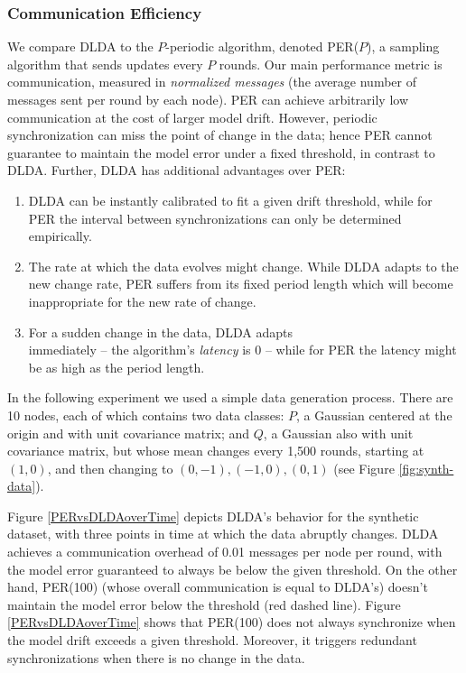 \subsubsection{Communication Efficiency}\label{sec:com_eff}
We compare DLDA to the $P$-periodic algorithm, denoted
PER($P$), a sampling algorithm that sends updates
every $P$ rounds.
Our main performance metric is communication, measured in \textit{normalized messages} (the average number of messages sent per round by each node). 
PER can achieve arbitrarily low communication at the cost of larger model drift. However,
periodic synchronization can miss the point of change in the data; 
hence PER cannot guarantee to maintain the model error under a fixed threshold, in contrast to DLDA.  Further,
DLDA has additional advantages over PER: 
\begin{enumerate}
\item DLDA can be instantly calibrated to fit a given drift threshold, while for PER the 
interval between synchronizations can only be determined empirically. 
\item The rate at which the data evolves might change. 
While DLDA adapts to the new change rate, PER suffers from its fixed period length
which will become inappropriate for the new rate of change.
\item For a sudden change in the data, DLDA adapts\\
immediately -- the algorithm's
\textit{latency} is 0 -- while for PER the latency might be as high as the period length.
\end{enumerate}
%
In the following experiment we used a simple data generation process. There are 
10 nodes, each of which contains two data classes: $P$, a Gaussian centered
at the origin and with unit covariance matrix; and $Q$, a Gaussian also
with unit covariance matrix, but whose mean changes every 1,500 rounds, starting 
at $(1,0)$, and then changing to $(0,-1), (-1,0), (0,1)$ (see 
Figure \ref{fig:synth-data}).



%
Figure \ref{PERvsDLDAoverTime} depicts DLDA's behavior for the synthetic dataset, with 
three points in time at which the data abruptly changes. 
DLDA achieves a communication overhead of 0.01 messages per node per round, with the model 
error guaranteed to always be below the given threshold.
On the other hand,  PER(100) (whose overall communication is equal to DLDA's) doesn't maintain the
model error below the threshold (red dashed line).
Figure \ref{PERvsDLDAoverTime} shows that PER(100) does not always 
synchronize when the model drift exceeds a given threshold. 
Moreover, it triggers redundant synchronizations when there is no change in the data.
%

